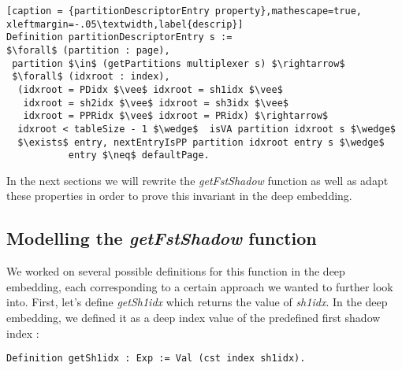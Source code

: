 \begin{itemize}
\begin{lstlisting}[caption = {partitionDescriptorEntry property},mathescape=true, xleftmargin=-.05\textwidth,label{descrip}]
Definition partitionDescriptorEntry s := 
$\forall$ (partition : page),  
 partition $\in$ (getPartitions multiplexer s) $\rightarrow$ 
 $\forall$ (idxroot : index), 
  (idxroot = PDidx $\vee$ idxroot = sh1idx $\vee$ 
   idxroot = sh2idx $\vee$ idxroot = sh3idx $\vee$ 
   idxroot = PPRidx $\vee$ idxroot = PRidx) $\rightarrow$
  idxroot < tableSize - 1 $\wedge$  isVA partition idxroot s $\wedge$  
  $\exists$ entry, nextEntryIsPP partition idxroot entry s $\wedge$  
           entry $\neq$ defaultPage.
\end{lstlisting} 
\vspace{4pt}	
\end{itemize}
In the next sections we will rewrite the \textit{getFstShadow} function as well as adapt these properties in order to prove this invariant in the deep embedding.


\subsection{Modelling the \textit{getFstShadow} function}

We worked on several possible definitions for this function in the deep embedding, each corresponding to a certain approach we wanted to further look into. 
First, let's define \textit{getSh1idx} which returns the value of \textit{sh1idx}. In the deep embedding, we defined it as a deep index value of the predefined first shadow index :
\begin{lstlisting}[caption = {Index of the first shadow in the deep embedding},xleftmargin=.02\textwidth,
xrightmargin=.02\textwidth]
Definition getSh1idx : Exp := Val (cst index sh1idx).
\end{lstlisting} \vspace{4pt}

